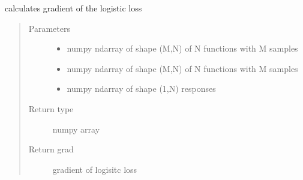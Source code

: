 \documentclass[letterpaper,10pt,english]{sphinxmanual}
\begin{document}
\begin{fulllineitems}
\label{\detokenize{regression:regression.logit_gradient}}
calculates gradient of the logistic loss
\begin{quote}\begin{description}
\item[{Parameters}] \leavevmode\begin{itemize}
\item {} 
 \textendash{} numpy ndarray of shape (M,N) of N functions with M samples

\item {} 
 \textendash{} numpy ndarray of shape (M,N) of N functions with M samples

\item {} 
 \textendash{} numpy ndarray of shape (1,N) responses

\end{itemize}

\item[{Return type}] \leavevmode
numpy array

\item[{Return grad}] \leavevmode
gradient of logisitc loss

\end{description}\end{quote}

\end{fulllineitems}

\end{document}
